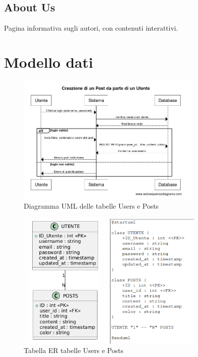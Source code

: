 \documentclass{article}
\theoremstyle{mytheoremstyle}
\theoremstyle{mytheoremstyle}
\theoremstyle{myproblemstyle}
\begin{document}
    \subsection{About Us}
      Pagina informativa sugli autori, con contenuti interattivi.


    \section{Modello dati}
      \begin{figure}[h!]
          \centering
          \includegraphics[width=0.8\textwidth]{Creazione.png}
          \caption{Diagramma UML delle tabelle Users e Posts}
          \label{fig:uml}
      \end{figure}

      \begin{figure}[h!]
          \centering
          \includegraphics[width=0.4\textwidth]{ER.png}
          \caption{Tabella ER tabelle Users e Posts}
          \label{fig:er}

          \includegraphics[width=0.4\textwidth]{plantUML.png}
      \end{figure}
\end{document}
